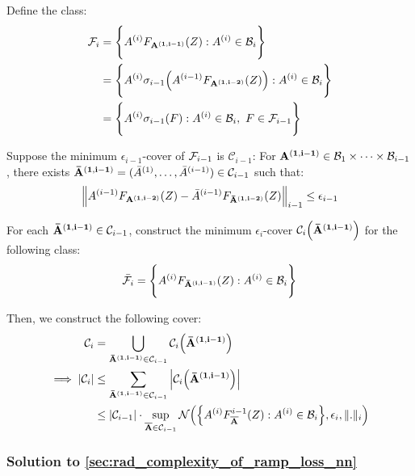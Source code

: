 \begin{proof*}
    
    \noindent Define the class:
    \begin{align*}
        \mathcal{F}_i &= \Bigg\{ 
            A^{(i)}F_{\bf A^{(1, i-1)}}(Z) : A^{(i)} \in \mathcal{B}_i        
         \Bigg\} \\
        &= \Bigg\{ 
            A^{(i)}\sigma_{i-1}\Big( 
                A^{(i-1)}F_{\bf A^{(1, i-2)}}(Z)
             \Big) : A^{(i)} \in \mathcal{B}_i
         \Bigg\} \\
        &= \Bigg\{ 
            A^{(i)}\sigma_{i-1}(F): A^{(i)} \in \mathcal{B}_i, \ F \in \mathcal{F}_{i-1}
         \Bigg\}
    \end{align*}


    \noindent Suppose the minimum $\epsilon_{i-1}$-cover of $\mathcal{F}_{i-1}$ is $\mathcal{C}_{i-1}$: For ${\bf A^{(1, i-1)}}\in\mathcal{B}_1\times\dots\times\mathcal{B}_{i-1}$, there exists ${\bf {\bar A}^{(1,i-1)}} = ({\bar A}^{(1)}, \dots, {\bar A}^{(i-1)}) \in \mathcal{C}_{i-1}$ such that:
    \begin{align*}
        \Big\| A^{(i-1)}F_{\bf A^{(1, i-2)}}(Z) - {\bar A}^{(i-1)}F_{\bf {\bar A}^{(1, i-2)}}(Z)\Big\|_{i-1} \le \epsilon_{i-1}
    \end{align*}

    \noindent For each ${\bf {\bar A}^{(1, i-1)}}\in\mathcal{C}_{i-1}$, construct the minimum $\epsilon_i$-cover $\mathcal{C}_i\Big( {\bf {\bar A}^{(1,i-1)}} \Big)$ for the following class:
    \begin{align*}
        \bar {\mathcal{F}}_i = \Bigg\{ A^{(i)}F_{\bf {\bar A}^{(i, i-1)}}(Z):A^{(i)}\in\mathcal{B}_i \Bigg\}
    \end{align*}
    
    \noindent Then, we construct the following cover:
    \begin{align*}
        \mathcal{C}_i &= \bigcup_{{\bf {\bar A}^{(1, i-1)}}\in\mathcal{C}_{i-1}}\mathcal{C}_i \Big( {\bf {\bar A}^{(1, i-1)}} \Big)
        \\
        \implies 
        |\mathcal{C}_i| &\le \sum_{{\bf {\bar A}^{(1, i-1)}}\in\mathcal{C}_{i-1}}\Big|
            \mathcal{C}_i \Big( {\bf {\bar A}^{(1, i-1)}} \Big)
        \Big| \\
        &\le |\mathcal{C}_{i-1}|\cdot\sup_{{\bf \overline{A}}\in\mathcal{C}_{i-1}} \mathcal{N}\Big( 
            \Big\{ 
                A^{(i)}F^{i-1}_{\bf \overline{A}}(Z):A^{(i)}\in\mathcal{B}_i
             \Big\}, \epsilon_i, \|.\|_i
         \Big)
    \end{align*}
\end{proof*}


\subsubsection{Solution to \ref{sec:rad_complexity_of_ramp_loss_nn}}

